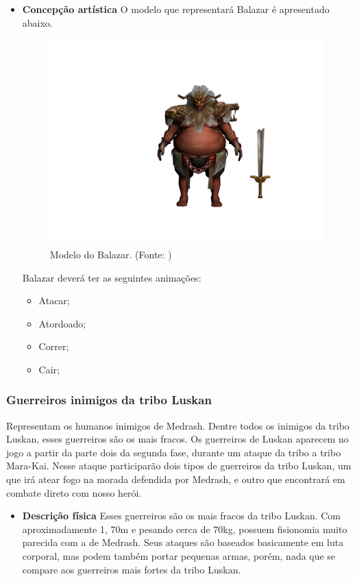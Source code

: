 \begin{itemize}
\item{\bf Concepção artística} O modelo que representará Balazar é apresentado abaixo.
 \begin{figure}[H]
 \centering
 \includegraphics[scale=0.33]{Imagens/inimigo01.png}
 \caption{Modelo do Balazar. (Fonte: \cite{bib:balasar01})}
\label{img:balazar}
\end{figure}

Balazar deverá ter as seguintes animações: 
\begin{itemize}
\item {Atacar;}
\item {Atordoado;}
\item {Correr;}
\item {Cair;}
\end{itemize}
\end{itemize}
\subsubsection{Guerreiros inimigos da tribo Luskan}
Representam os humanos inimigos de Medrash. Dentre todos os inimigos da tribo Luskan, esses guerreiros são os mais fracos. Os guerreiros de Luskan aparecem no jogo a partir da parte dois da segunda fase, durante um ataque da tribo a tribo Mara-Kai. Nesse ataque participarão dois tipos de guerreiros da tribo Luskan, um que irá atear fogo na morada defendida por Medrash, e outro que encontrará em combate direto com nosso herói.

\begin{itemize}
\item{\bf Descrição física}
Esses guerreiros são os mais fracos da tribo Luskan. Com aproximadamente 1, 70m e pesando cerca de 70kg, possuem fisionomia muito parecida com a de Medrash. Seus ataques são baseados basicamente em luta corporal, mas podem também portar pequenas armas, porém, nada que se compare aos guerreiros mais fortes da tribo Luskan.
\end{itemize}

